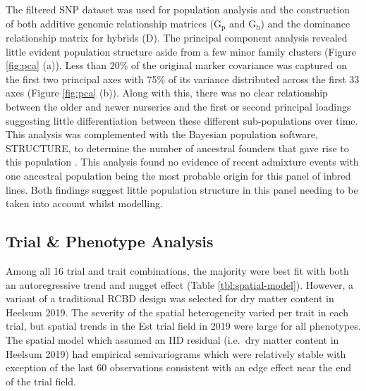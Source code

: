 \begin{refsection}
The filtered SNP dataset was used for population analysis and the construction of both additive genomic relationship matrices (\(\mathrm{ G_p}\) and \(\mathrm{ G_h}\)) and the dominance relationship matrix for hybrids (\(\mathrm{D}\)). The principal component analysis revealed little evident population structure aside from a few minor family clusters (Figure \ref{fig:pca} (a)). Less than 20\% of the original marker covariance was captured on the first two principal axes with 75\% of its variance distributed across the first 33 axes (Figure \ref{fig:pca} (b)). Along with this, there was no clear relationship between the older and newer nurseries and the first or second principal loadings suggesting little differentiation between these different sub-populations over time. This analysis was complemented with the Bayesian population software, STRUCTURE, to determine the number of ancestral founders that gave rise to this population \parencite{Falush2003}. This analysis found no evidence of recent admixture events with one ancestral population being the most probable origin for this panel of inbred lines. Both findings suggest little population structure in this panel needing to be taken into account whilst modelling.

\subsection{Trial \& Phenotype Analysis}

Among all 16 trial and trait combinations, the majority were best fit with both an autoregressive trend and nugget effect (Table \ref{tbl:spatial-model}). However, a variant of a traditional RCBD design was selected for dry matter content in Heelsum 2019. The severity of the spatial heterogeneity varied per trait in each trial, but spatial trends in the Est trial field in 2019 were large for all phenotypes. The spatial model which assumed an IID residual (i.e.~dry matter content in Heelsum 2019) had empirical semivariograms which were relatively stable with exception of the last 60 observations consistent with an edge effect near the end of the trial field.


\end{refsection}
